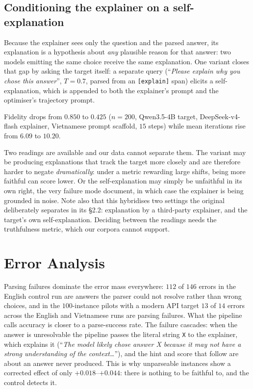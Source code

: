 \documentclass[11pt]{article}
\begin{document}
\subsection{Conditioning the explainer on a self-explanation}
\label{sec:reasoning}

Because the explainer sees only the question and the parsed answer, its
explanation is a hypothesis about \emph{any} plausible reason for that answer:
two models emitting the same choice receive the same explanation. One variant
closes that gap by asking the target itself: a separate query
(``\emph{Please explain why you chose this answer}'', $T=0.7$, parsed from an
\texttt{[explain]\ldots@} span) elicits a self-explanation, which is appended to
both the explainer's prompt and the optimiser's trajectory prompt.

Fidelity drops from $0.850$ to $0.425$ ($n=200$, Qwen3.5-4B target,
DeepSeek-v4-flash explainer, Vietnamese prompt scaffold, $15$ steps) while mean
iterations rise from $6.09$ to $10.20$.

Two readings are available and our data cannot separate them. The variant may
be producing explanations that track the target more closely and are therefore
harder to negate \emph{dramatically}: under a metric rewarding large shifts,
being more faithful can score lower. Or the self-explanation may simply be
unfaithful in its own right, the very failure mode
\citet{turpin2023unfaithful} document, in which case the explainer is being
grounded in noise. Note also that this hybridises two settings the original
deliberately separates in its \S2.2: explanation by a third-party explainer, and
the target's own self-explanation. Deciding between the readings needs the
truthfulness metric, which our corpora cannot support.

\section{Error Analysis}

Parsing failures dominate the error mass everywhere: $112$ of $146$ errors in
the English control run are answers the parser could not resolve rather than
wrong choices, and in the $100$-instance pilots with a modern API target $13$
of $14$ errors across the English and Vietnamese runs are parsing failures.
What the pipeline calls accuracy is closer to a parse-success rate. The failure
cascades: when the answer is unresolvable the pipeline passes the literal
string \texttt{X} to the explainer, which explains it (``\emph{The model likely
chose answer X because it may not have a strong understanding of the
context\ldots}''), and the hint and score that follow are about an answer never
produced. This is why unparseable instances show a corrected effect of only
$+0.018$--$+0.044$: there is nothing to be faithful to, and the control detects
it.
\end{document}
